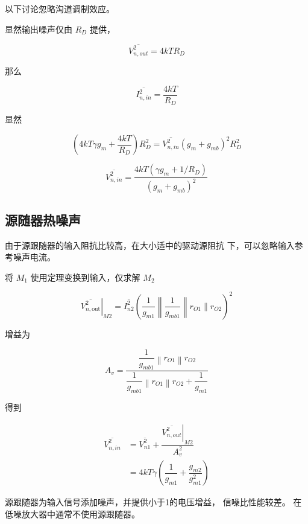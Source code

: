 \documentclass[cn,11pt,chinese,black,simple]{../elegantbook}
\begin{document}
以下讨论忽略沟道调制效应。

显然输出噪声仅由 \(R_D\) 提供，

\[\overline{V_{n,out}^2} = 4 k T R_D\]

那么 

\[\overline{I_{n,in}^2} = \dfrac{4 k T}{R_D}\]



显然

\[\left(4 k T \gamma g_{m}+\dfrac{4 k T}{R_{D}}\right) R_{D}^{2}=\overline{V_{n, i n}^{2}}\left(g_{m}+g_{m b}\right)^{2} R_{D}^{2}\]

\[\overline{V_{n, i n}^{2}}=\dfrac{4 k T\left(\gamma g_{m}+1 / R_{D}\right)}{\left(g_{m}+g_{m b}\right)^{2}}\]



\subsection{源随器热噪声}

由于源跟随器的输入阻抗比较高，在大小适中的驱动源阻抗
下，可以忽略输入参考噪声电流。


将 \(M_1\) 使用定理变换到输入，仅求解 \(M_2\)

\[\left.\overline{V_{n, \text {out}}^{2}}\right|_{M 2}=\overline{I_{n 2}^{2}}\left(\dfrac{1}{g_{m 1}}\left\|\dfrac{1}{g_{m b 1}}\right\| r_{O 1} \| r_{O 2}\right)^{2}\]

增益为

\[A_{v}=\dfrac{\dfrac{1}{g_{m b 1}}\left\|r_{O 1}\right\| r_{O 2}}{\dfrac{1}{g_{m b 1}}\left\|r_{O 1}\right\| r_{O 2}+\dfrac{1}{g_{m 1}}}\]

得到

\[\begin{aligned}
    \overline{V_{n, i n}^{2}} &=\overline{V_{n 1}^{2}}+\dfrac{\left.\overline{V_{n, o u t}^{2}}\right|_{M 2}}{A_{v}^{2}} \\
    &=4 k T \gamma\left(\dfrac{1}{g_{m 1}}+\dfrac{g_{m 2}}{g_{m 1}^{2}}\right)
\end{aligned}\]



源跟随器为输入信号添加噪声，并提供小于1的电压增益，
信噪比性能较差。
在低噪放大器中通常不使用源跟随器。


\ifx\mainclass\undefined
\end{document}
